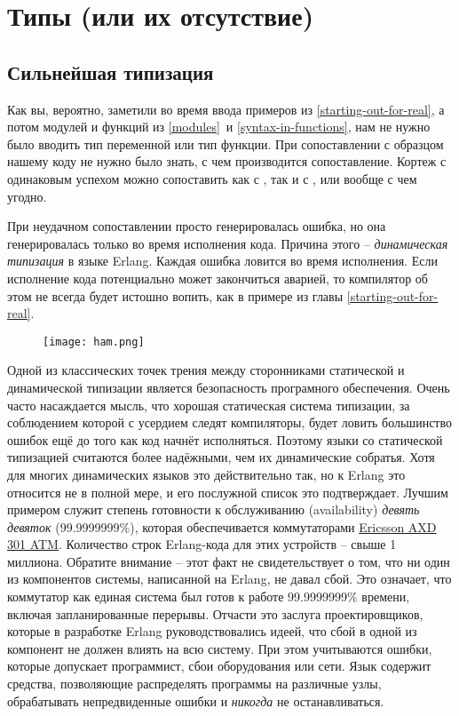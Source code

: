 \chapter{Типы (или их отсутствие)}
\label{types-or-lack-thereof}
\section{Сильнейшая типизация}
Как вы, вероятно, заметили во время ввода примеров из \ref{starting-out-for-real}, а потом модулей и функций из \ref{modules}~и \ref{syntax-in-functions}, нам не нужно было вводить тип переменной или тип функции.
При сопоставлении с образцом нашему коду не нужно было знать, с чем производится сопоставление.
Кортеж  с одинаковым успехом можно сопоставить как с , так и с ,  или вообще с чем угодно.

При неудачном сопоставлении просто генерировалась ошибка, но она генерировалась только во время исполнения кода.
Причина этого \--- \emph{динамическая типизация} в языке Erlang.
Каждая ошибка ловится во время исполнения.
Если исполнение кода потенциально может закончиться аварией, то компилятор об этом не всегда будет истошно вопить, как в примере  из главы \ref{starting-out-for-real}.

\begin{figure}[h!]
    \centering
    \texttt{[image: ham.png]}
\end{figure} 
Одной из классических точек трения между сторонниками статической и динамической типизации является безопасность програмного обеспечения.
Очень часто насаждается мысль, что хорошая статическая система типизации, за соблюдением которой с усердием следят компиляторы, будет ловить большинство ошибок ещё до того как код начнёт исполняться.
Поэтому языки со статической типизацией считаются более надёжными, чем их динамические собратья.
Хотя для многих динамических языков это действительно так, но к Erlang это относится не в полной мере, и его послужной список это подтверждает.
Лучшим примером служит степень готовности к обслуживанию (availability) \emph{девять девяток} (99.9999999\%), которая обеспечивается коммутаторами \href{http://www.erlang.se/publications/Ulf_Wiger.pdf}{Ericsson AXD 301 ATM}.
Количество строк Erlang\--кода для этих устройств \--- свыше 1 миллиона.
Обратите внимание \--- этот факт не свидетельствует о том, что ни один из компонентов системы, написанной на Erlang, не давал сбой.
Это означает, что коммутатор как единая система был готов к работе 99.9999999\% времени, включая запланированные перерывы.
Отчасти это заслуга проектировщиков, которые в разработке Erlang руководствовались идеей, что сбой в одной из компонент не должен влиять на всю систему.
При этом учитываются ошибки, которые допускает программист, сбои оборудования или сети.
Язык содержит средства, позволяющие распределять программы на различные узлы, обрабатывать непредвиденные ошибки и \emph{никогда} не останавливаться.

